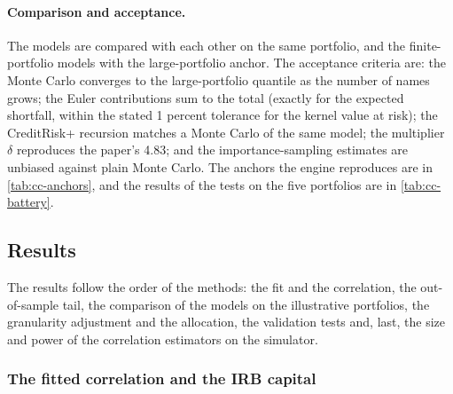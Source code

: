 \paragraph{Comparison and acceptance.} The models are compared with each other on the same portfolio, and the finite-portfolio models with
the large-portfolio anchor. The acceptance criteria are: the Monte Carlo converges to the large-portfolio quantile as the number of names
grows; the Euler contributions sum to the total (exactly for the expected shortfall, within the stated 1 percent tolerance for the kernel
value at risk); the CreditRisk+ recursion matches a Monte Carlo of the same model; the multiplier $\delta$ reproduces the paper's 4.83;
and the importance-sampling estimates are unbiased against plain Monte Carlo. The anchors the engine reproduces are in
\cref{tab:cc-anchors}, and the results of the tests on the five portfolios are in \cref{tab:cc-battery}.

\subsection{Results}
\label{sec:results-credit-capital}

The results follow the order of the methods: the fit and the correlation, the out-of-sample tail, the comparison of the models on the
illustrative portfolios, the granularity adjustment and the allocation, the validation tests and, last, the size and power of the
correlation estimators on the simulator.

\subsubsection{The fitted correlation and the IRB capital}



